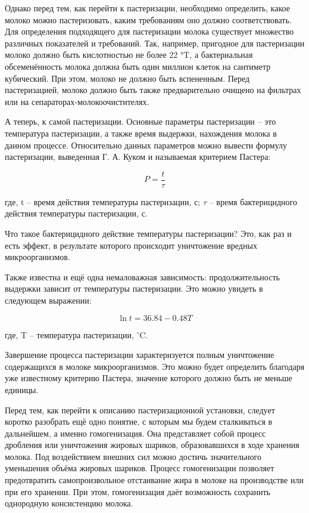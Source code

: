 {  \par \redline Однако перед тем, как перейти к пастеризации, необходимо определить, какое молоко можно пастеризовать, каким требованиям оно должно соответствовать. Для определения подходящего для пастеризации молока существует множество различных показателей и требований. Так, например, пригодное для пастеризации молоко должно быть кислотностью не более 22 °T, а бактериальная обсеменённость молока должна быть один миллион клеток на сантиметр кубический. При этом, молоко не должно быть вспененным. Перед пастеризацией, молоко должно быть также предварительно очищено на фильтрах или на сепараторах-молокоочистителях. 

  \par \redline А теперь, к самой пастеризации. Основные параметры пастеризации {--} это температура пастеризации, а также время выдержки, нахождения молока в данном процессе. Относительно данных параметров можно вывести формулу пастеризации, выведенная Г. А. Куком и называемая критерием Пастера:
  
  \par

  \[P=\frac{t}{\tau}\]

  где, t {--} время действия температуры пастеризации, с; $\tau$ {--} время бактерицидного действия температуры пастеризации, с.  

  \par \redline Что такое бактерицидного действие температуры пастеризации? Это, как раз и есть эффект, в результате которого происходит уничтожение вредных микроорганизмов. 

  \par \redline Также известна и ещё одна немаловажная зависимость: продолжительность выдержки зависит от температуры пастеризации. Это можно увидеть в следующем выражении: 
  
  \par 

  \[\ln{t} = 36.84 - 0.48T\]

  где, T {--} температура пастеризации, $^{\circ}$C.

  \par \redline Завершение процесса пастеризации характеризуется полным уничтожение содержащихся в молоке микроорганизмов. Это можно будет определить благодаря уже известному критерию Пастера, значение которого должно быть не меньше единицы. 



  \par \redline 	Перед тем, как перейти к описанию пастеризационной установки, следует коротко разобрать ещё одно понятие, с которым мы будем сталкиваться в дальнейшем, а именно гомогенизация. Она представляет собой процесс дробления или уничтожения жировых шариков, образовавшихся в ходе хранения молока. Под воздействием внешних сил можно достичь значительного уменьшения объёма жировых шариков. Процесс гомогенизации позволяет предотвратить самопроизвольное отстаивание жира в молоке на производстве или при его хранении. При этом, гомогенизация даёт возможность сохранить однородную консистенцию молока.

  \par
}

